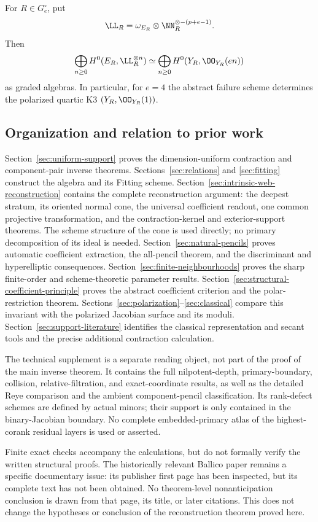 \begin{theorem}
\label{thm:main-reconstruction}
For \(R\in G_e^\circ\), put
\[
 \LL_R=\omega_{E_R}\otimes
 \NN_R^{\otimes-(p+e-1)}.
\]
Then
\[
 \bigoplus_{n\ge0}H^0(E_R,\LL_R^{\otimes n})
 \simeq
 \bigoplus_{n\ge0}H^0(Y_R,\OO_{Y_R}(en))
\]
as graded algebras.  In particular, for \(e=4\) the abstract
failure scheme determines the polarized quartic K3
\((Y_R,\OO_{Y_R}(1))\).
\end{theorem}


\subsection{Organization and relation to prior work}

Section~\ref{sec:uniform-support} proves the dimension-uniform
contraction and component-pair inverse theorems.
Sections~\ref{sec:relations} and \ref{sec:fitting} construct the algebra
and its Fitting scheme.  Section~\ref{sec:intrinsic-web-reconstruction}
contains the complete reconstruction argument: the deepest stratum,
its oriented normal cone, the universal coefficient readout, one
common projective transformation, and the contraction-kernel and
exterior-support theorems.  The scheme structure of the cone is
used directly; no primary decomposition of its ideal is needed.
Section~\ref{sec:natural-pencils} proves automatic coefficient extraction,
the all-pencil theorem, and the discriminant and hyperelliptic
consequences.  Section~\ref{sec:finite-neighbourhoods} proves the
sharp finite-order and scheme-theoretic parameter results.  Section~\ref{sec:structural-coefficient-principle} proves the abstract
coefficient criterion and the polar-restriction theorem.
Sections~\ref{sec:polarization}--\ref{sec:classical} compare this
invariant with the polarized Jacobian surface and its moduli.
Section~\ref{sec:support-literature} identifies the classical
representation and secant tools and the precise additional
contraction calculation.

The technical supplement is a separate reading object, not part of
the proof of the main inverse theorem.  It contains the full
nilpotent-depth, primary-boundary, collision, relative-filtration,
and exact-coordinate results, as well as the detailed Reye comparison
and the ambient component-pencil classification.  Its rank-defect
schemes are defined by actual minors; their support is only contained
in the binary-Jacobian boundary.  No complete embedded-primary atlas
of the highest-corank residual layers is used or asserted.

Finite exact checks accompany the calculations, but do not formally
verify the written structural proofs.  The historically relevant
Ballico paper \cite{Ballico93} remains a specific documentary issue:
its publisher first page has been inspected, but its complete text
has not been obtained.  No theorem-level nonanticipation conclusion
is drawn from that page, its title, or later citations.
This does not change the hypotheses or conclusion of the reconstruction
theorem proved here.
